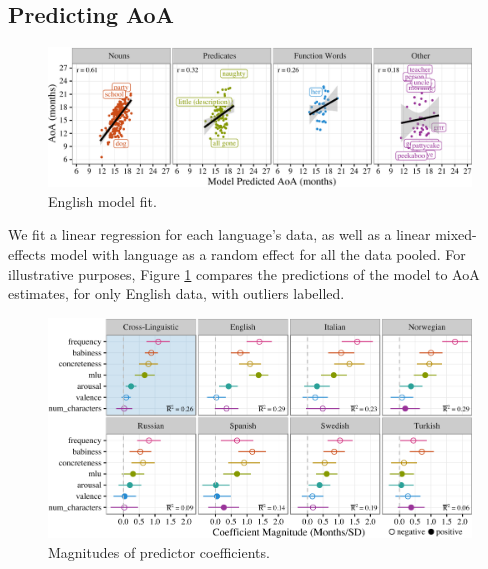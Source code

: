 \documentclass[10pt, letterpaper]{article}
\newenvironment{CodeChunk}{}{}
\begin{document}
\subsection{Predicting AoA}\label{predicting-aoa}

\begin{CodeChunk}
\begin{figure}[tb]

{\centering \includegraphics{figs/fit-1} 

}

\caption[English model fit]{English model fit.}\label{fig:fit}
\end{figure}
\end{CodeChunk}

We fit a linear regression for each language's data, as well as a linear
mixed-effects model with language as a random effect for all the data
pooled. For illustrative purposes, Figure \ref{fig:fit} compares the
predictions of the model to AoA estimates, for only English data, with
outliers labelled.

\begin{CodeChunk}
\begin{figure}[tb]

{\centering \includegraphics{figs/coefs-1} 

}

\caption[Magnitudes of predictor coefficients]{Magnitudes of predictor coefficients.}\label{fig:coefs}
\end{figure}
\end{CodeChunk}
\end{document}
